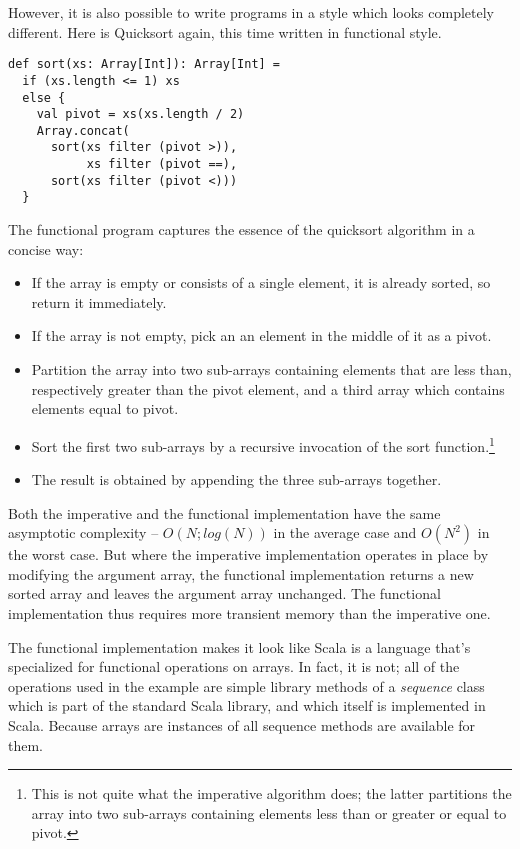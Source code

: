 However, it is also possible to write programs in a style which looks
completely different. Here is Quicksort again, this time written in
functional style.

\begin{lstlisting}
def sort(xs: Array[Int]): Array[Int] =
  if (xs.length <= 1) xs
  else {
    val pivot = xs(xs.length / 2)
    Array.concat(
      sort(xs filter (pivot >)),
           xs filter (pivot ==),
      sort(xs filter (pivot <)))
  }
\end{lstlisting}

The functional program captures the essence of the quicksort algorithm
in a concise way:
\begin{itemize}
\item If the array is empty or consists of a single element, 
      it is already sorted, so return it immediately.
\item If the array is not empty, pick an an element in the middle of
      it as a pivot.
\item Partition the array into two sub-arrays containing elements that
are less than, respectively greater than the pivot element, and a
third array which contains elements equal to pivot.
\item Sort the first two sub-arrays by a recursive invocation of
the sort function.\footnote{This is not quite what the imperative algorithm does;
the latter partitions the array into two sub-arrays containing elements
less than or greater or equal to pivot.}
\item The result is obtained by appending the three sub-arrays together.
\end{itemize}
Both the imperative and the functional implementation have the same
asymptotic complexity -- $O(N;log(N))$ in the average case and
$O(N^2)$ in the worst case. But where the imperative implementation
operates in place by modifying the argument array, the functional
implementation returns a new sorted array and leaves the argument
array unchanged. The functional implementation thus requires more
transient memory than the imperative one.

The functional implementation makes it look like Scala is a language
that's specialized for functional operations on arrays. In fact, it is
not; all of the operations used in the example are simple library
methods of a {\em sequence} class  which is part of the
standard Scala library, and which itself is implemented in
Scala. Because arrays are instances of \verb@Seq@ all sequence
methods are available for them.

